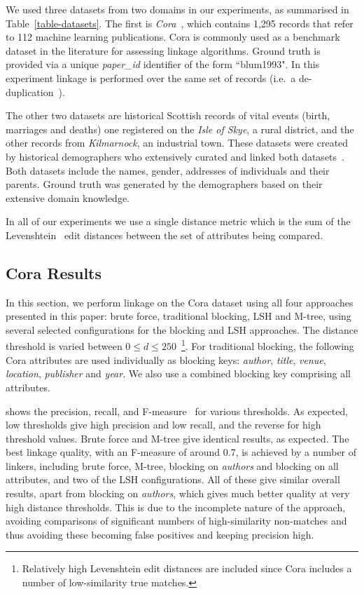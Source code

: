 \documentclass{llncs}
\begin{document}

\label{sec-data}
We used three datasets from two domains in our experiments, as
summarised in Table~\ref{table-datasets}. The first is
\emph{Cora}~\cite{Cora2017}, which contains 1,295 records that refer
to 112 machine learning publications. Cora is commonly used as a
benchmark dataset in the literature for assessing linkage algorithms.
Ground truth is provided via a unique \emph{paper\_id} identifier of
the form ``blum1993". In this experiment linkage is performed over
the same set of records (i.e.\ a de-duplication~\cite{Chr12}).

The other two datasets are historical Scottish records of vital events
(birth, marriages and deaths) one registered on the \emph{Isle of
Skye}, a rural district, and the other records from
\emph{Kilmarnock}, an industrial town. These datasets were created by
historical demographers who extensively curated and linked both
datasets~\cite{reid2006,reid2002}. Both datasets include the names,
gender, addresses of individuals and their parents. Ground truth was
generated by the demographers based on their extensive domain
knowledge.

In all of our experiments we use a single distance metric which is the
sum of the Levenshtein~\cite{Levenshtein66} edit distances between the
set of attributes being compared.

\subsection{Cora Results}

In this section, we perform linkage on the Cora dataset using all four
approaches presented in this paper: brute force, traditional blocking,
LSH and M-tree, using several selected configurations for the blocking
and LSH approaches. The distance threshold is varied between $0 \le d
\le 250$~\footnote{Relatively high Levenshtein edit distances are
included since Cora includes a number of low-similarity true
matches.}. For traditional blocking, the following Cora attributes are
used individually as blocking keys: \emph{author}, \emph{title},
\emph{venue}, \emph{location}, \emph{publisher} and \emph{year}. We
also use a combined blocking key comprising all attributes.

 shows the precision, recall, and F-measure~\cite{Chr12} for various thresholds. As expected, low 
thresholds give high precision and low recall, and the reverse for high
threshold values. Brute force and M-tree give identical results, as
expected. The best linkage quality, with an F-measure of around 0.7,
is achieved by a number of linkers, including brute force, M-tree, blocking on \emph{authors} and blocking on all attributes, and two
of the LSH configurations. All of these give similar overall results,
apart from blocking on \emph{authors}, which gives much better quality
at very high distance thresholds. This is due to the incomplete
nature of the approach, avoiding comparisons of significant numbers
of high-similarity non-matches and thus avoiding these becoming false
positives and keeping precision high.
\end{document}
